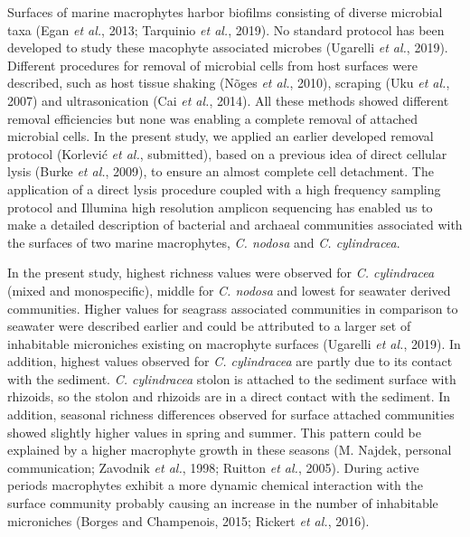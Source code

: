 \documentclass[12pt,]{article}
\begin{document}
Surfaces of marine macrophytes harbor biofilms consisting of diverse
microbial taxa (Egan \emph{et al.}, 2013; Tarquinio \emph{et al.},
2019). No standard protocol has been developed to study these macophyte
associated microbes (Ugarelli \emph{et al.}, 2019). Different procedures
for removal of microbial cells from host surfaces were described, such
as host tissue shaking (Nõges \emph{et al.}, 2010), scraping (Uku
\emph{et al.}, 2007) and ultrasonication (Cai \emph{et al.}, 2014). All
these methods showed different removal efficiencies but none was
enabling a complete removal of attached microbial cells. In the present
study, we applied an earlier developed removal protocol (Korlević
\emph{et al.}, submitted), based on a previous idea of direct cellular
lysis (Burke \emph{et al.}, 2009), to ensure an almost complete cell
detachment. The application of a direct lysis procedure coupled with a
high frequency sampling protocol and Illumina high resolution amplicon
sequencing has enabled us to make a detailed description of bacterial
and archaeal communities associated with the surfaces of two marine
macrophytes, \emph{C. nodosa} and \emph{C. cylindracea}.

In the present study, highest richness values were observed for \emph{C.
cylindracea} (mixed and monospecific), middle for \emph{C. nodosa} and
lowest for seawater derived communities. Higher values for seagrass
associated communities in comparison to seawater were described earlier
and could be attributed to a larger set of inhabitable microniches
existing on macrophyte surfaces (Ugarelli \emph{et al.}, 2019). In
addition, highest values observed for \emph{C. cylindracea} are partly
due to its contact with the sediment. \emph{C. cylindracea} stolon is
attached to the sediment surface with rhizoids, so the stolon and
rhizoids are in a direct contact with the sediment. In addition,
seasonal richness differences observed for surface attached communities
showed slightly higher values in spring and summer. This pattern could
be explained by a higher macrophyte growth in these seasons (M. Najdek,
personal communication; Zavodnik \emph{et al.}, 1998; Ruitton \emph{et
al.}, 2005). During active periods macrophytes exhibit a more dynamic
chemical interaction with the surface community probably causing an
increase in the number of inhabitable microniches (Borges and
Champenois, 2015; Rickert \emph{et al.}, 2016).
\end{document}
